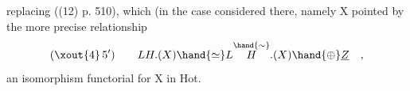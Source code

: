 replacing ((12) p. 510), which  (in the case considered
there, namely X pointed\hand{)}  by the more precise relationship
\[ (\xout{4}\, 5') \qquad LH.(X) \hand{\simeq} L\overset{\hand{\sim}}{H}.(X) \hand{\oplus} \underline{Z} \quad , \]
an isomorphism functorial for X in Hot\hand{$^{\bullet}$}.


